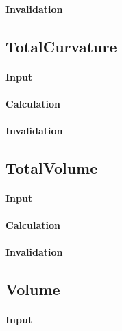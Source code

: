\paragraph{Invalidation}

\bigskip

\subsection{TotalCurvature}

\paragraph{Input}

\paragraph{Calculation}

\paragraph{Invalidation}

\bigskip

\subsection{TotalVolume}

\paragraph{Input}

\paragraph{Calculation}

\paragraph{Invalidation}

\bigskip

\subsection{Volume}

\paragraph{Input}

